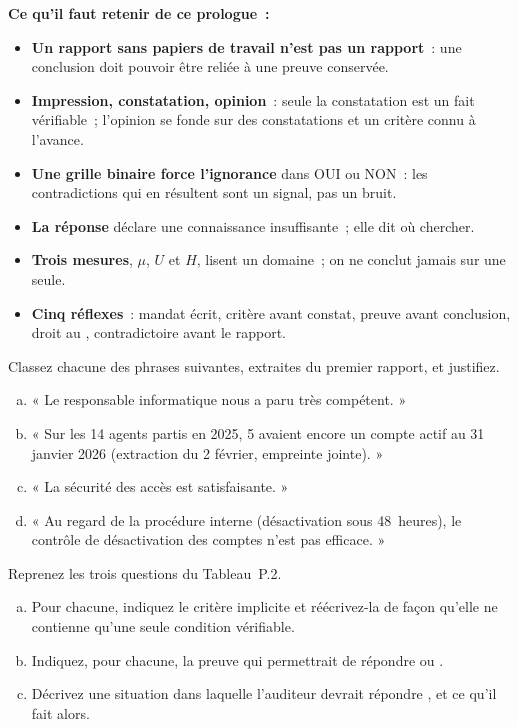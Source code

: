 \begin{boxresume}
\textbf{Ce qu'il faut retenir de ce prologue~:}
\begin{itemize}
    \item \textbf{Un rapport sans papiers de travail n'est pas un rapport}~:
          une conclusion doit pouvoir être reliée à une preuve conservée.
    \item \textbf{Impression, constatation, opinion}~: seule la constatation
          est un fait vérifiable~; l'opinion se fonde sur des constatations
          et un critère connu à l'avance.
    \item \textbf{Une grille binaire force l'ignorance} dans OUI ou NON~:
          les contradictions qui en résultent sont un signal, pas un bruit.
    \item \textbf{La réponse \NEK{}} déclare une connaissance insuffisante~;
          elle dit où chercher.
    \item \textbf{Trois mesures}, $\mu$, $U$ et $H$, lisent un domaine~; on ne
          conclut jamais sur une seule.
    \item \textbf{Cinq réflexes}~: mandat écrit, critère avant constat,
          preuve avant conclusion, droit au \NEK{}, contradictoire avant le
          rapport.
\end{itemize}
\end{boxresume}

\bigskip

\begin{boxexo}[title={\ding{45}\quad Exercice~P.1. Impression, constatation ou opinion~? \niveaubase}]
Classez chacune des phrases suivantes, extraites du premier rapport, et
justifiez.
\begin{enumerate}[(a)]
    \item « Le responsable informatique nous a paru très compétent. »
    \item « Sur les 14 agents partis en 2025, 5 avaient encore un compte actif
          au 31 janvier 2026 (extraction du 2 février, empreinte jointe). »
    \item « La sécurité des accès est satisfaisante. »
    \item « Au regard de la procédure interne (désactivation sous 48~heures),
          le contrôle de désactivation des comptes n'est pas efficace. »
\end{enumerate}
\end{boxexo}

\begin{boxexo}[title={\ding{45}\quad Exercice~P.2. Réécrire trois questions \niveaumoyen}]
Reprenez les trois questions du Tableau~P.2.
\begin{enumerate}[(a)]
    \item Pour chacune, indiquez le critère implicite et réécrivez-la de
          façon qu'elle ne contienne qu'une seule condition vérifiable.
    \item Indiquez, pour chacune, la preuve qui permettrait de répondre
          \OUI{} ou \NON{}.
    \item Décrivez une situation dans laquelle l'auditeur devrait répondre
          \NEK{}, et ce qu'il fait alors.
\end{enumerate}
\end{boxexo}

